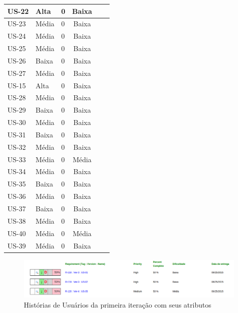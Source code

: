 \begin{table}
\begin{tabular}{ | l | l | l | c | c | c |}
 US-22 & Alta     & 0                & Baixa       &                 \\\hline
 US-23 & Média   & 0                & Baixa       &                 \\\hline
 US-24 & Média   & 0                & Baixa       &                 \\\hline
 US-25 & Média   & 0                & Baixa       &                 \\\hline
 US-26 & Baixa      & 0                & Baixa       &                 \\\hline
 US-27 & Média   & 0                & Baixa       &                 \\\hline
 US-15 & Alta     & 0                & Baixa       &                 \\\hline
 US-28 & Média   & 0                & Baixa       &                 \\\hline
 US-29 & Baixa      & 0                & Baixa       &                 \\\hline
 US-30 & Média   & 0                & Baixa       &                 \\\hline
 US-31 & Baixa      & 0                & Baixa       &                 \\\hline
 US-32 & Média   & 0                & Baixa       &                 \\\hline
 US-33 & Média   & 0                & Média       &                 \\\hline
 US-34 & Média   & 0                & Baixa       &                 \\\hline
 US-35 & Baixa      & 0                & Baixa       &                 \\\hline
 US-36 & Média   & 0                & Baixa       &                 \\\hline
 US-37 & Baixa      & 0                & Baixa       &                 \\\hline
 US-38 & Média   & 0                & Baixa       &                 \\\hline
 US-40 & Média   & 0                & Média       &                 \\\hline
 US-39 & Média   & 0                & Baixa       &                 \\\hline
\end{tabular}
\end{table}

\begin{figure}[h]
\centering
\includegraphics[width=1\linewidth]{figuras/iteracao_atributos.png}
\caption{Histórias de Usuários da primeira iteração com seus atributos}
\label{fig:iteracao_atributos}
\end{figure}
